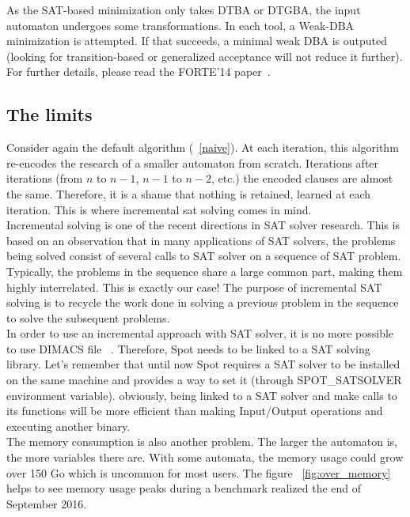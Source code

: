 \noindent As the SAT-based minimization only takes DTBA or DTGBA, the input automaton undergoes some
transformations. In each tool, a Weak-DBA minimization is attempted. If that succeeds, a minimal weak DBA
is outputed (looking for transition-based or generalized acceptance will not reduce it further). For
further details, please read the FORTE'14 paper~\cite{14}.

\subsection{The limits}
Consider again the default algorithm (~\ref{naive}).
At each iteration, this algorithm re-encodes the research of a smaller automaton from scratch. Iterations
after iterations (from $n$ to $n-1$, $n-1$ to $n-2$, etc.) the encoded clauses are almost the same.
Therefore, it is a shame that nothing is retained, learned at each iteration. This is where incremental sat
solving comes in mind.\\

Incremental solving is one of the recent directions in SAT solver research. This is
based on an observation that in many applications of SAT solvers, the problems being solved consist of
several calls to SAT solver on a sequence of SAT problem. Typically, the problems in the sequence share a
large common part, making them highly interrelated. This is exactly our case! The purpose of incremental
SAT solving is to recycle the work done in solving a previous problem in the sequence to solve the
subsequent problems.\\

In order to use an incremental approach with SAT solver, it is no more possible to use DIMACS file
~\cite{18}. Therefore, Spot needs to be linked to a SAT solving library. Let's remember that until now
Spot requires a SAT solver to be installed on the same machine and provides a way to set it (through
SPOT\_SATSOLVER environment variable). obviously, being linked to a SAT solver and make calls to its
functions will be more efficient than making Input/Output operations and executing another binary.\\

The memory consumption is also another problem. The larger the automaton is, the more variables there are.
With some automata, the memory usage could grow over 150 Go which is uncommon for most users. The figure
~\ref{fig:over_memory} helps to see memory usage peaks during a benchmark realized the end of September
2016.\\

